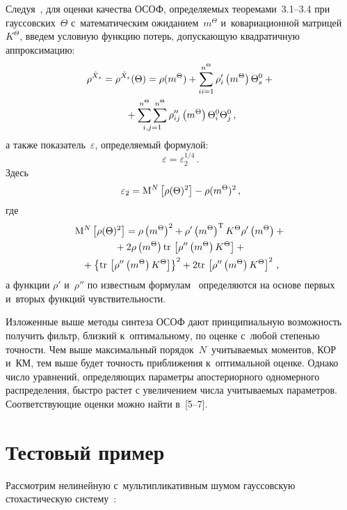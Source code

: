 \begin{multicols}{2}
Следуя~\cite{1-s1, 2-s1}, для оценки качества ОСОФ, определяемых теоремами~3.1--3.4 
при гауссовских~$\Theta$ с~математическим ожиданием~$m^\Theta$ и~ковариационной 
матрицей~$K^\Theta$, введем условную функцию потерь, допускающую квадратичную 
аппроксимацию:
\begin{multline*}
    \rho^{\hat X_s}=\rho^{\hat X_s}(\Theta) =\rho (m^\Theta) +\sss_{ii=1}^{n^\Theta} 
    \rho_i' \left(m^\Theta\right)\Theta_s^0+ {}\\
    {}+\ss2\limits_{i,j=1} 
    \rho_{ij}'' \left(m^\Theta\right)\Theta_i^0 \Theta_j^0\,,
    \end{multline*}
а также показатель~$\varepsilon$, определяемый формулой:
  \begin{equation*}
  \varepsilon =\varepsilon_2^{1/4}\,.
  \end{equation*}
Здесь
    $$
    \varepsilon_2 = \mm^N \lk \rho (\Theta)^2\rk -\rho (m^\Theta)^2\,, %
    $$
где
\begin{multline*}
\mathrm{M}^N \left[ \rho(\Theta)^2\right] = \rho \left(m^\Theta\right)^2 +
\rho' \left(m^\Theta\right)^{\mathrm{T}} K^\Theta \rho'\left(m^\Theta\right)+ {}\\
{}+
2\rho \left(m^\Theta\right) \mathrm{tr}\, \left[ 
\rho''\left(m^\Theta\right)K^\Theta\right]+{}\\
{}+\left\{ \mathrm{tr}\, \left[ \rho'' \left(m^\Theta\right) K^\Theta\right] \right\}^2+2 \mathrm{tr}\, 
\left[ \rho''\left(m^\Theta\right) K^\Theta\right]^2\,,
\end{multline*}
а функции $\rho'$ и~$\rho''$ по известным формулам~\cite{9-s1, 10-s1} 
определяются на основе первых и~вторых функций чувствительности.

Изложенные выше методы синтеза ОСОФ дают
принципиальную возможность получить фильтр, близкий к~оптимальному, по
оценке с~любой степенью точности.
Чем выше максимальный порядок~$N$~учитываемых моментов, КОР и~КМ, тем выше будет точность
приближения к~оптимальной оценке. Однако число уравнений,
определяющих параметры апостериорного одномерного распределения, быстро растет
с увеличением числа учитываемых параметров.
Соответствующие оценки можно найти в~[5--7].

\section{Тестовый пример}

Рассмотрим нелинейную с~мультипликативным шумом гауссовскую  стохастическую систему~\cite{6-s1}:


\end{multicols}
